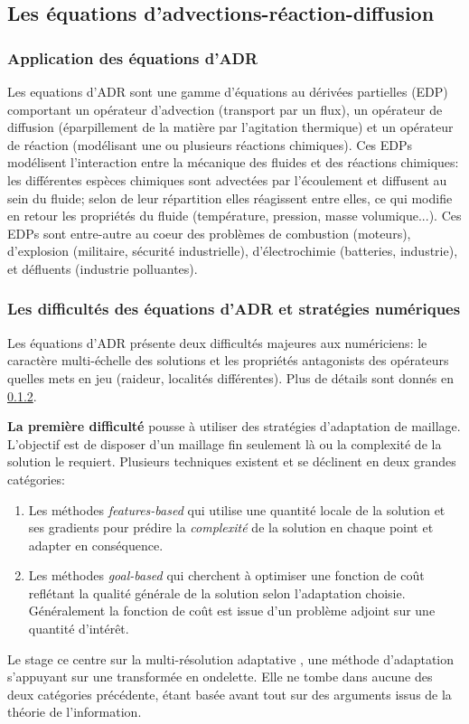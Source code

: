 \subsection{Les équations d'advections-réaction-diffusion}
    \subsubsection{Application des équations d'ADR}
    Les equations d'ADR sont une gamme d'équations au dérivées partielles (EDP) comportant un opérateur d'advection (transport par un flux),
    un opérateur de diffusion (éparpillement de la matière par l'agitation thermique) et un opérateur de réaction (modélisant une ou plusieurs réactions chimiques).
    Ces EDPs modélisent l'interaction entre la mécanique des fluides et des réactions chimiques: les différentes espèces chimiques sont advectées par l'écoulement et diffusent au sein du fluide;
    selon de leur répartition elles réagissent entre elles, ce qui modifie en retour les propriétés du fluide (température, pression, masse volumique...). 
    Ces EDPs sont entre-autre au coeur des problèmes de combustion (moteurs), d'explosion (militaire, sécurité industrielle), d’électrochimie (batteries, industrie), 
    et défluents (industrie polluantes).
    \subsubsection{Les difficultés des équations d'ADR et stratégies numériques}
    Les équations d'ADR présente deux difficultés majeures aux numériciens: le caractère multi-échelle des solutions et les propriétés antagonists des opérateurs quelles mets en jeu
    (raideur, localités différentes). Plus de détails sont donnés en \ref{}.\par

    \textbf{La première difficulté} pousse à utiliser des stratégies d'adaptation de maillage. L'objectif est de disposer d'un maillage fin seulement là ou la complexité de la solution le requiert.
    Plusieurs techniques existent et se déclinent en deux grandes catégories\cite{}:
    \begin{enumerate}
        \item Les méthodes \textit{features-based} qui utilise une quantité locale de la solution et ses gradients pour prédire la \textit{complexité} de la solution en chaque point 
        et adapter en conséquence.
        \item Les méthodes \textit{goal-based} qui cherchent à optimiser une fonction de coût reflétant la qualité générale de la solution selon l'adaptation choisie.
        Généralement la fonction de coût est issue d'un problème adjoint sur une quantité d’intérêt.
    \end{enumerate}
    Le stage ce centre sur la multi-résolution adaptative \cite{}, une méthode d'adaptation s'appuyant sur une transformée en ondelette.
    Elle ne tombe dans aucune des deux catégories précédente, étant basée avant tout sur des arguments issus de la théorie de l'information.\par

